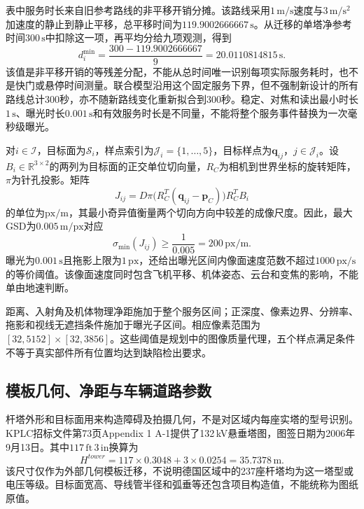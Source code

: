 表中服务时长来自旧参考路线的非平移开销分摊。该路线采用$1\,\mathrm{m/s}$速度与$3\,\mathrm{m/s^2}$加速度的静止到静止平移，总平移时间为$119.9002666667\,\mathrm s$。从迁移的单塔净参考时间$300\,\mathrm s$中扣除这一项，再平均分给九项观测，得到
\begin{equation}
 d_i^{\min}=\frac{300-119.9002666667}{9}
 =20.0110814815\,\mathrm s.
 \label{s0601:service_residual}
\end{equation}
该值是非平移开销的等残差分配，不能从总时间唯一识别每项实际服务耗时，也不是快门或悬停时间测量。联合模型沿用这个固定服务下界，但不强制新设计的所有路线总计300秒，亦不随新路线变化重新拟合到300秒。稳定、对焦和读出最小时长$1\,\mathrm s$、曝光时长$0.001\,\mathrm s$和有效服务时长是不同量，不能将整个服务事件替换为一次毫秒级曝光。

对$i\in\mathcal I$，目标面为$\mathcal S_i$，样点索引为$\mathcal J_i=\{1,\ldots,5\}$，目标样点为$\mathbf q_{ij}$，$j\in\mathcal J_i$。设$B_i\in\mathbb R^{3\times2}$的两列为目标面的正交单位切向量，$R_C$为相机到世界坐标的旋转矩阵，$\pi$为针孔投影。矩阵
\begin{equation}
 J_{ij}=D\pi\bigl(R_C^T(\mathbf q_{ij}-\mathbf p_C)\bigr)R_C^TB_i
 \label{s0601:surface_scale}
\end{equation}
的单位为$\mathrm{px/m}$，其最小奇异值衡量两个切向方向中较差的成像尺度。因此，最大GSD为$0.005\,\mathrm{m/px}$对应
\begin{equation}
 \sigma_{\min}(J_{ij})\ge\frac{1}{0.005}
 =200\,\mathrm{px/m}.
 \label{s0601:gsd_conversion}
\end{equation}
曝光为$0.001\,\mathrm s$且拖影上限为$1\,\mathrm{px}$，还给出曝光区间内像面速度范数不超过$1000\,\mathrm{px/s}$的等价阈值。该像面速度同时包含飞机平移、机体姿态、云台和变焦的影响，不能单由地速判断。

距离、入射角及机体物理净距施加于整个服务区间；正深度、像素边界、分辨率、拖影和视线无遮挡条件施加于曝光子区间。相应像素范围为$[32,5152]\times[32,3856]$。这些阈值是规划中的图像质量代理，五个样点满足条件不等于真实部件所有位置均达到缺陷检出要求。

\subsection{模板几何、净距与车辆道路参数}

杆塔外形和目标面用来构造障碍及拍摄几何，不是对区域内每座实塔的型号识别。KPLC招标文件第73页Appendix 1 A-1提供了132\,kV悬垂塔图，图签日期为2006年9月13日\cite{KPLC2025}。其中$117\,\mathrm{ft}\,3\,\mathrm{in}$换算为
\begin{equation}
 H^{tower}=117\times0.3048+3\times0.0254
 =35.7378\,\mathrm m.
 \label{s0601:tower_height_conversion}
\end{equation}
该尺寸仅作为外部几何模板迁移，不说明德国区域中的237座杆塔均为这一塔型或电压等级。目标面宽高、导线管半径和弧垂等还包含项目构造值，不能统称为图纸原值。

